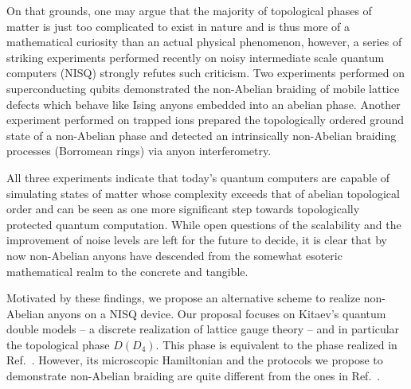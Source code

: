 \documentclass[two column]{article}
\begin{document}
%
%
%
%
%
%
%
%
%

On that grounds, one may argue that the majority of topological phases of matter is just too complicated to exist in nature and is thus more of a mathematical curiosity than an actual physical phenomenon, however, a series of striking experiments \cite{iqbal2023creation,xu2022digital,andersen2022observation} performed recently on noisy intermediate scale quantum computers (NISQ) strongly refutes such  criticism. Two experiments performed on superconducting qubits \cite{xu2022digital,andersen2022observation} demonstrated the non-Abelian braiding of mobile lattice defects which behave like Ising anyons embedded into an abelian phase. Another experiment performed on trapped ions \cite{iqbal2023creation} prepared the topologically ordered ground state of a non-Abelian phase and detected an intrinsically non-Abelian braiding processes (Borromean rings) via anyon interferometry. 

All three experiments indicate that today's quantum computers are capable of simulating states of matter whose complexity exceeds that of abelian topological order and can be seen as one more significant step towards topologically protected quantum computation. While open questions of the scalability and the improvement of noise levels are left for the future to decide, it is clear that by now non-Abelian anyons have descended from the somewhat esoteric mathematical realm to the concrete and tangible.

Motivated by these findings, we propose an alternative scheme to realize non-Abelian anyons on a NISQ device. Our proposal focuses on Kitaev's quantum double models -- a discrete realization of lattice gauge theory -- and in particular the topological phase $D(D_4)$. This phase is equivalent to the phase realized in Ref.~\cite{iqbal2023creation}. However, its microscopic Hamiltonian and the protocols we propose to demonstrate non-Abelian braiding are quite different from the ones in Ref.~\cite{iqbal2023creation}. 
\end{document}
